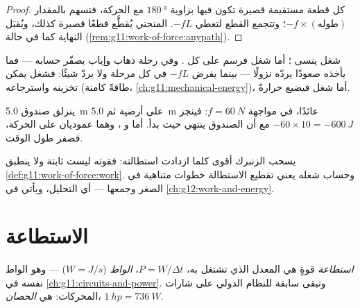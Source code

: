 \begin{proof}
كل قطعة مستقيمة قصيرة تكون فيها  بزاوية $\qty{180}{\degree}$ مع
الحركة، فتسهم بالمقدار $-f \times (\text{طوله})$؛ وتتجمع القطع
لتعطي $-fL$.  المنحني يُقطَّع قطعًا قصيرة كذلك، ويُقبَل
النهاية كما في حالة  (\cref{rem:g11:work-of-force:anypath}).
\end{proof}

\begin{remark}\label{rem:g11:work-of-force:divide}
شغل  ينسى ؛ أما شغل  فرسم على كل . وفي
رحلة ذهاب وإياب يصفّر  حسابه --- فما يأخذه صعودًا يردّه
نزولًا --- بينما يفرض  $-fL$ في كل مرحلة ولا يردّ
شيئًا: فشغل  يمكن تخزينه واسترجاعه (طاقةً كامنة،
\cref{ch:g11:mechanical-energy})، أما شغل  فيضيع حرارةً.
\end{remark}

\begin{example}\label{ex:g11:work-of-force:roundtrip}
ينزلق صندوق \qty{5.0}{m} على أرضية ثم \qty{5.0}{m} عائدًا،
في مواجهة $f = \qty{60}{N}$: فينجز  $-60 \times 10 =
\qty{-600}{J}$ مع أن الصندوق ينتهي حيث بدأ. أما  و
، وهما عموديان على الحركة، فصفر طول الوقت.
\end{example}

\begin{remark}\label{rem:g11:work-of-force:spring}
يسحب الزنبرك أقوى كلما ازدادت استطالته: فقوته ليست
ثابتة ولا ينطبق \cref{def:g11:work-of-force:work}.
وحساب شغله يعني تقطيع الاستطالة خطوات متناهية في الصغر
وجمعها --- أي التحليل، ويأتي في \cref{ch:g12:work-and-energy}.
\end{remark}

\section{الاستطاعة}

\begin{definition}[الاستطاعة]\label{def:g11:work-of-force:power}
\emph{استطاعة} قوةٍ هي المعدل الذي
تشتغل به، $P = W/\Delta t$،  \emph{الواط}
($\unit{W} = \unit{J/s}$) --- وهو الواط نفسه في
\cref{ch:g11:circuits-and-power}. وتبقى  سابقة للنظام الدولي على شارات
المحركات: هي \emph{الحصان}،
$\qty{1}{hp} = \qty{736}{W}$.
\end{definition}

